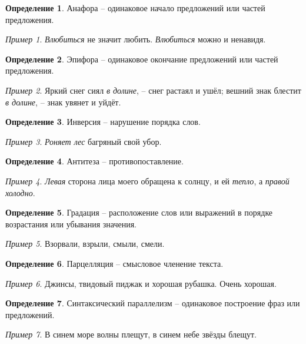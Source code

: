 \documentclass[12pt]{article}
\theoremstyle{definition}
\newtheorem{definition}{Определение}
\theoremstyle{remark}
\newtheorem*{example}{Пример}
\begin{document}
\begin{definition}
    Анафора -- одинаковое начало предложений или частей предложения.
    \begin{example}
        \textsl{Влюбиться} не значит любить. \textsl{Влюбиться} можно и ненавидя.
    \end{example}
\end{definition}
\begin{definition}
    Эпифора -- одинаковое окончание предложений или частей предложения.
    \begin{example}
        Яркий снег сиял \textsl{в долине}, -- снег растаял и ушёл; вешний знак блестит \textsl{в долине}, -- знак увянет и уйдёт.
    \end{example}
\end{definition}
\begin{definition}
    Инверсия -- нарушение порядка слов.
    \begin{example}
        \textsl{Роняет лес} багряный свой убор.
    \end{example}
\end{definition}
\begin{definition}
    Антитеза -- противопоставление.
    \begin{example}
        \textsl{Левая} сторона лица моего обращена к солнцу, и ей \textsl{тепло}, а \textsl{правой холодно}.
    \end{example}
\end{definition}
\begin{definition}
    Градация -- расположение слов или выражений в порядке возрастания или убывания значения.
    \begin{example}
        Взорвали, взрыли, смыли, смели.
    \end{example}
\end{definition}
\begin{definition}
    Парцелляция -- смысловое членение текста.
    \begin{example}
        Джинсы, твидовый пиджак и хорошая рубашка. Очень хорошая.
    \end{example}
\end{definition}
\begin{definition}
    Синтаксический параллелизм -- одинаковое построение фраз или предложений.
    \begin{example}
        В синем море волны плещут, в синем небе звёзды блещут.
    \end{example}
\end{definition}
\end{document}
